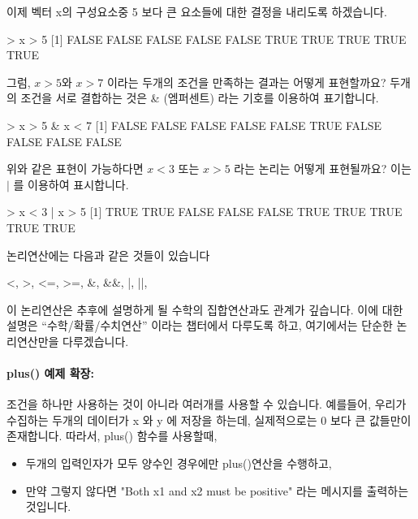 \documentclass{book}
\begin{document}
이제 벡터 x의 구성요소중 5 보다 큰 요소들에 대한 결정을 내리도록 하겠습니다. 

\begin{Schunk}
\begin{Soutput}
> x > 5
 [1] FALSE FALSE FALSE FALSE FALSE  TRUE  TRUE  TRUE  TRUE  TRUE
\end{Soutput}
\end{Schunk}

그럼, $x>5$와  $x>7$ 이라는 두개의 조건을 만족하는 결과는 어떻게 표현할까요?
두개의 조건을 서로 결합하는 것은 \& (엠퍼센트) 라는 기호를 이용하여 표기합니다. 
 
\begin{Schunk}
\begin{Soutput}
> x > 5 & x < 7
 [1] FALSE FALSE FALSE FALSE FALSE  TRUE FALSE FALSE FALSE FALSE
\end{Soutput}
\end{Schunk}

위와 같은 표현이 가능하다면 $x<3$ 또는 $x>5$ 라는 논리는 어떻게 표현될까요? 
이는 $|$ 를 이용하여 표시합니다. 

\begin{Schunk}
\begin{Soutput}
> x < 3 | x > 5
 [1]  TRUE  TRUE FALSE FALSE FALSE  TRUE  TRUE  TRUE  TRUE  TRUE
\end{Soutput}
\end{Schunk}

논리연산에는 다음과 같은 것들이 있습니다
\begin{Schunk}
\begin{Soutput}
<, >, <=, >=, &, &&, |, ||, 
\end{Soutput}
\end{Schunk}

이 논리연산은 추후에 설명하게 될 수학의 집합연산과도 관계가 깊습니다. 
이에 대한 설명은 ``수학/확률/수치연산'' 이라는 챕터에서 다루도록 하고, 여기에서는 단순한 논리연산만을 다루겠습니다. 

\paragraph{plus() 예제 확장: }

조건을 하나만 사용하는 것이 아니라 여러개를 사용할 수 있습니다. 
예를들어, 우리가 수집하는 두개의 데이터가 x 와  y 에 저장을 하는데, 실제적으로는 0 보다 큰 값들만이 존재합니다. 
따라서, plus() 함수를 사용할때,  

\begin{itemize}
\item 두개의 입력인자가 모두 양수인 경우에만 plus()연산을 수행하고,
\item 만약 그렇지 않다면 "Both x1 and x2 must be positive" 라는 메시지를 출력하는 것입니다.
\end{itemize}
\end{document}
